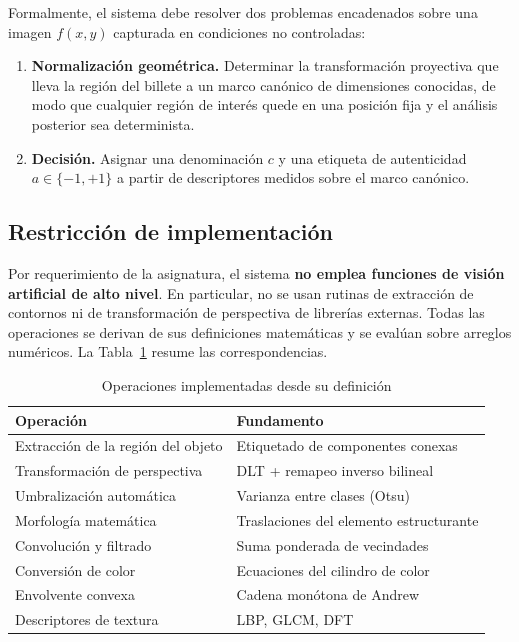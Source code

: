 \documentclass[conference]{IEEEtran}
\begin{document}
Formalmente, el sistema debe resolver dos problemas encadenados sobre
una imagen $f(x,y)$ capturada en condiciones no controladas:

\begin{enumerate}
\item \textbf{Normalización geométrica.} Determinar la transformación
      proyectiva que lleva la región del billete a un marco canónico de
      dimensiones conocidas, de modo que cualquier región de interés
      quede en una posición fija y el análisis posterior sea
      determinista.
\item \textbf{Decisión.} Asignar una denominación $c$ y una etiqueta de
      autenticidad $a \in \{-1, +1\}$ a partir de descriptores medidos
      sobre el marco canónico.
\end{enumerate}

\subsection{Restricción de implementación}

Por requerimiento de la asignatura, el sistema \textbf{no emplea
funciones de visión artificial de alto nivel}. En particular, no se usan
rutinas de extracción de contornos ni de transformación de perspectiva
de librerías externas. Todas las operaciones se derivan de sus
definiciones matemáticas y se evalúan sobre arreglos numéricos. La
Tabla~\ref{tab:implementacion} resume las correspondencias.

\begin{table}[h]
\centering
\caption{Operaciones implementadas desde su definición}
\label{tab:implementacion}
\small
\begin{tabular}{@{}ll@{}}
\toprule
\textbf{Operación} & \textbf{Fundamento} \\
\midrule
Extracción de la región del objeto & Etiquetado de componentes conexas \\
Transformación de perspectiva & DLT + remapeo inverso bilineal \\
Umbralización automática & Varianza entre clases (Otsu) \\
Morfología matemática & Traslaciones del elemento estructurante \\
Convolución y filtrado & Suma ponderada de vecindades \\
Conversión de color & Ecuaciones del cilindro de color \\
Envolvente convexa & Cadena monótona de Andrew \\
Descriptores de textura & LBP, GLCM, DFT \\
\bottomrule
\end{tabular}
\end{table}
\end{document}
